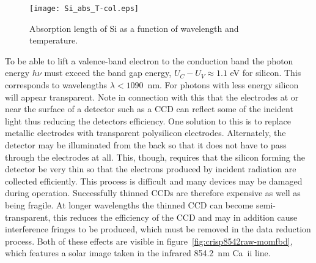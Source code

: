 \begin{figure}[h!]
	\centering
	\texttt{[image: Si\_abs\_T-col.eps]}
	\caption{Absorption length of Si as a function of wavelength and temperature.}
	\label{fig:si-abs}
\end{figure}

To be able to lift a valence-band electron to the conduction band the
photon energy $h\nu$ must exceed the band gap energy, $U_C-U_V \approx
1.1$ eV for silicon. This corresponds to wavelengths $\lambda < 1090$~nm. 
For photons with less energy silicon will appear transparent. Note in 
connection with this that the electrodes at or near the surface of a
detector such as a CCD can reflect some of the incident light thus reducing
the detectors efficiency. One solution to this is to replace 
metallic electrodes with transparent polysilicon electrodes. Alternately,
the detector may be illuminated from the back so that it does not have to
pass through the electrodes at all. This, though, requires that the silicon
forming the detector be very thin so that the electrons produced by 
incident radiation are collected efficiently. This process is difficult
and many devices may be damaged during operation. Successfully thinned
CCDs are therefore expensive as well as being fragile. At longer 
wavelengths the thinned CCD can become semi-transparent, this reduces the
efficiency of the CCD and may in addition cause interference fringes 
to be produced, which must be removed in the data reduction process. Both
of these effects are visible in figure~\ref{fig:crisp8542raw-momfbd}, which
features a solar image taken in the infrared 854.2~nm Ca~{\sc ii} line.

